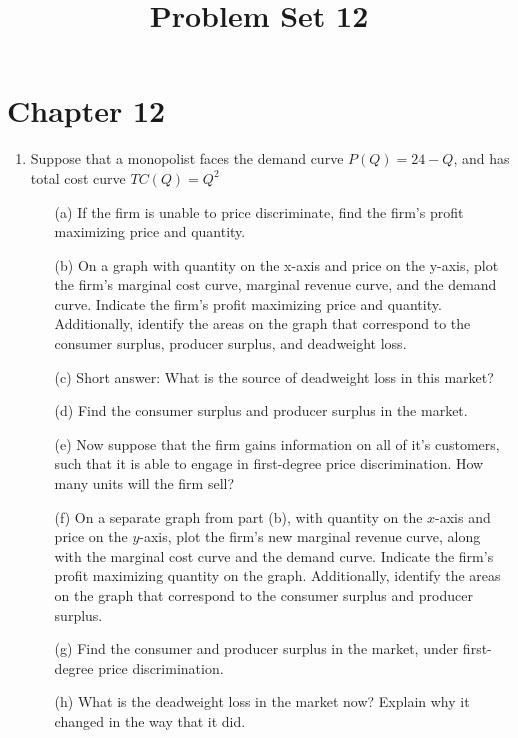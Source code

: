 \documentclass[11pt]{article}
\title{Problem Set 12}
\begin{document}
  
\section*{Chapter 12}

\begin{enumerate}

  \item Suppose that a monopolist faces the demand curve $P(Q)=24-Q$, and has total cost curve $T C(Q)=Q^{2}$

  \begin{enumerate}
    \item[(a)] If the firm is unable to price discriminate, find the firm's profit maximizing price and quantity.

    \item[(b)] On a graph with quantity on the x-axis and price on the y-axis, plot the firm's marginal cost curve, marginal revenue curve, and the demand curve. Indicate the firm's profit maximizing price and quantity. Additionally, identify the areas on the graph that correspond to the consumer surplus, producer surplus, and deadweight loss.

    \item[(c)] Short answer: What is the source of deadweight loss in this market?

    \item[(d)] Find the consumer surplus and producer surplus in the market.

    \item[(e)] Now suppose that the firm gains information on all of it's customers, such that it is able to engage in first-degree price discrimination. How many units will the firm sell?

    \item[(f)] On a separate graph from part (b), with quantity on the $x$-axis and price on the $y$-axis, plot the firm's new marginal revenue curve, along with the marginal cost curve and the demand curve. Indicate the firm's profit maximizing quantity on the graph. Additionally, identify the areas on the graph that correspond to the consumer surplus and producer surplus.

    \item[(g)] Find the consumer and producer surplus in the market, under first-degree price discrimination.    
     
    \item[(h)] What is the deadweight loss in the market now? Explain why it changed in the way that it did.
  \end{enumerate}


\end{enumerate}
\end{document}
